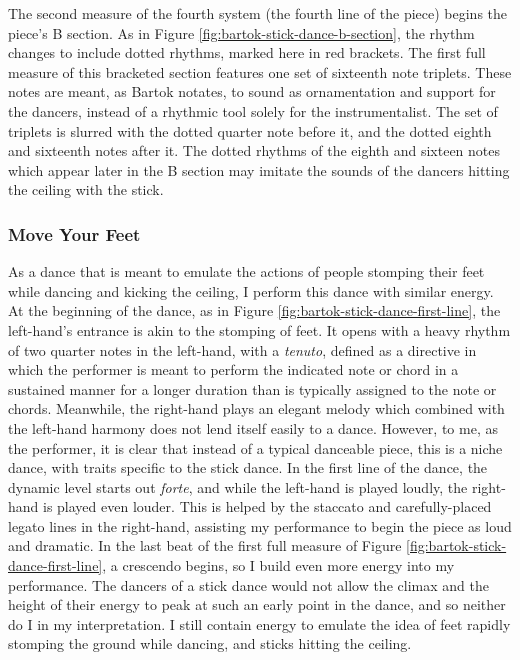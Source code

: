 The second measure of the fourth system (the fourth line of the piece) begins the piece's B section. As in Figure \ref{fig:bartok-stick-dance-b-section}\autocite{Lung_2016}, the rhythm changes to include dotted rhythms, marked here in red brackets. The first full measure of this bracketed section features one set of sixteenth note triplets. These notes are meant, as Bartok notates, to sound as ornamentation and support for the dancers, instead of a rhythmic tool solely for the instrumentalist. The set of triplets is slurred with the dotted quarter note before it, and the dotted eighth and sixteenth notes after it. The dotted rhythms of the eighth and sixteen notes which appear later in the B section may imitate the sounds of the dancers hitting the ceiling with the stick.

\subsubsection{Move Your Feet}

As a dance that is meant to emulate the actions of people stomping their feet while dancing and kicking the ceiling, I perform this dance with similar energy. At the beginning of the dance, as in Figure \ref{fig:bartok-stick-dance-first-line}\autocite{Lung_2016}, the left-hand's entrance is akin to the stomping of feet. It opens with a heavy rhythm of two quarter notes in the left-hand, with a \textit{tenuto}, defined as a directive in which the performer is meant to perform the indicated note or chord in a sustained manner for a longer duration than is typically assigned to the note or chords. Meanwhile, the right-hand plays an elegant melody which combined with the left-hand harmony does not lend itself easily to a dance. However, to me, as the performer, it is clear that instead of a typical danceable piece, this is a niche dance, with traits specific to the stick dance. In the first line of the dance, the dynamic level starts out \textit{forte}, and while the left-hand is played loudly, the right-hand is played even louder. This is helped by the staccato and carefully-placed legato lines in the right-hand, assisting my performance to begin the piece as loud and dramatic. In the last beat of the first full measure of Figure \ref{fig:bartok-stick-dance-first-line}\autocite{Lung_2016}, a crescendo begins, so I build even more energy into my performance. The dancers of a stick dance would not allow the climax and the height of their energy to peak at such an early point in the dance, and so neither do I in my interpretation. I still contain energy to emulate the idea of feet rapidly stomping the ground while dancing, and sticks hitting the ceiling. 

